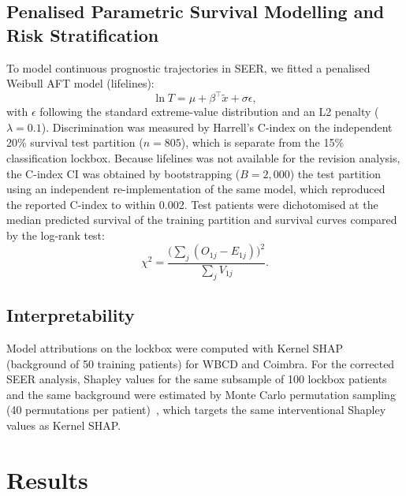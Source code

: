 \documentclass[11pt,a4paper]{article}
\begin{document}
\subsection{Penalised Parametric Survival Modelling and Risk Stratification}\label{sec:penalised-parametric-survival-}
To model continuous prognostic trajectories in SEER, we fitted a penalised Weibull AFT model (lifelines):
\begin{equation}
\ln T=\mu+\beta^{\top}\tilde{x}+\sigma\epsilon,
\end{equation}
with $\epsilon$ following the standard extreme-value distribution and an L2 penalty ($\lambda=0.1$). Discrimination was measured by Harrell's C-index on the independent 20\% survival test partition ($n=805$), which is separate from the 15\% classification lockbox. Because lifelines was not available for the revision analysis, the C-index CI was obtained by bootstrapping ($B=2{,}000$) the test partition using an independent re-implementation of the same model, which reproduced the reported C-index to within 0.002. Test patients were dichotomised at the median predicted survival of the training partition and survival curves compared by the log-rank test:
\begin{equation}
\chi^2=\frac{\big(\sum_j(O_{1j}-E_{1j})\big)^2}{\sum_j V_{1j}}.
\end{equation}

\subsection{Interpretability}\label{sec:interpretability}
Model attributions on the lockbox were computed with Kernel SHAP~\cite{lundberg2017} (background of 50 training patients) for WBCD and Coimbra. For the corrected SEER analysis, Shapley values for the same subsample of 100 lockbox patients and the same background were estimated by Monte Carlo permutation sampling (40 permutations per patient)~\cite{strumbelj2014}, which targets the same interventional Shapley values as Kernel SHAP.

\section{Results}\label{sec:results}
\end{document}
